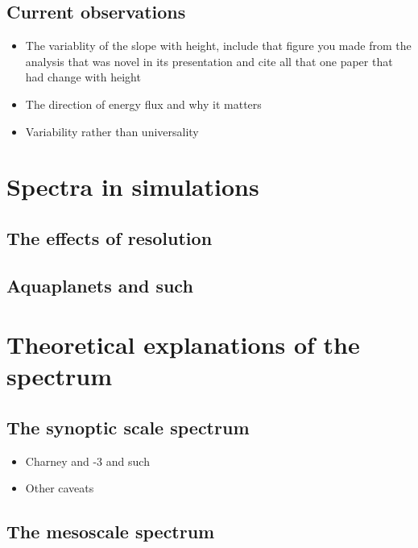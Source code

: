 \subsection{Current observations}

\begin{itemize}

\item{The variablity of the slope with height, include that figure you made from the analysis that was novel in its presentation and cite all that one paper that had change with height}

\item{The direction of energy flux and why it matters}

\item{Variability rather than universality}

\end{itemize}

\section{Spectra in simulations}

\subsection{The effects of resolution}

\subsection{Aquaplanets and such}

\section{Theoretical explanations of the spectrum}

\subsection{The synoptic scale spectrum}

\begin{itemize}

\item{Charney and -3 and such}

\item{Other caveats}

\end{itemize}

\subsection{The mesoscale spectrum}

